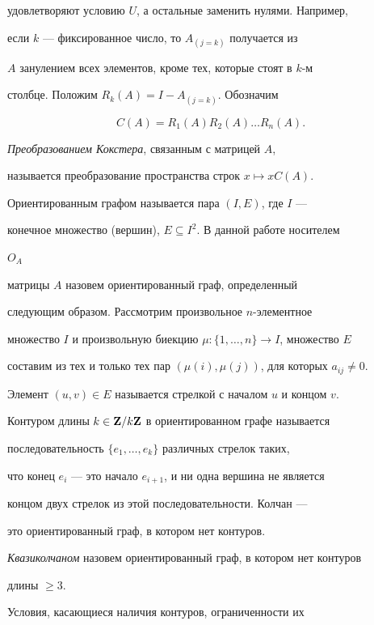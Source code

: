 удовлетворяют условию $U$, а остальные заменить нулями. Например,  


если $k$ --- фиксированное число, то $A_{(j=k)}$ получается из 


$A$ занулением всех элементов, кроме тех, которые стоят в $k$-м 


столбце. Положим $R_k(A)=I-A_{(j=k)}$. Обозначим 


$$ 


C(A)=R_1(A)R_2(A)\dotsc R_n(A). 


$$ 


{\it Преобразованием Кокстера}, связанным с матрицей $A$,  


называется преобразование пространства строк $x\mapsto xC(A)$. 


 


Ориентированным графом называется пара $(I,E)$, где $I$ ---  


конечное множество (вершин), $E\subseteq I^2$. В данной работе носителем 


$O_A$ 


матрицы $A$ назовем ориентированный граф, определенный  


следующим образом. Рассмотрим произвольное $n$-элементное 


множество $I$ и произвольную биекцию $\mu:\{1,\dotsc,n\}\to I$, множество $E$ 


составим из тех и только тех пар $(\mu(i),\mu(j))$, для которых $a_{ij}\ne0$. 


 


Элемент $(u,v)\in E$ называется стрелкой с началом $u$ и концом $v$. 


Контуром длины $k\in\bold Z/k\bold Z$ в ориентированном графе называется 


последовательность $\{e_1,\dotsc,e_k\}$ различных стрелок таких, 


что конец $e_i$ --- это начало $e_{i+1}$, и ни одна вершина не является 


концом двух стрелок из этой последовательности. Колчан --- 


это ориентированный граф, в котором нет контуров. 


{\it Квазиколчаном} назовем ориентированный граф, в котором нет контуров 


длины $\ge3$. 


 


Условия, касающиеся наличия контуров, ограниченности их 


